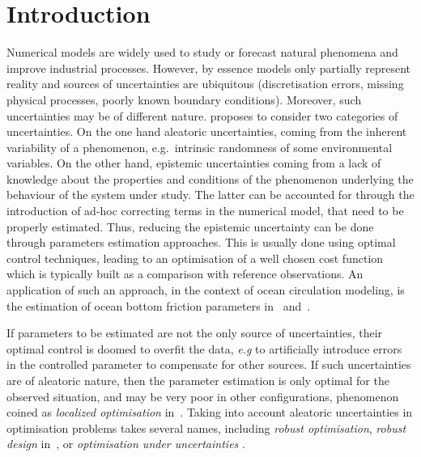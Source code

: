\documentclass[preprint, 1p]{elsarticle}
\newcommand{\arthur}[1]{{\itshape\color{cyan} ({#1})}}
\begin{document}

\section{Introduction}
\label{sec:intro}

Numerical models are widely used to study or forecast natural phenomena and improve industrial processes. However, by essence models only partially represent reality and sources of uncertainties are ubiquitous (discretisation errors, missing physical processes, poorly known boundary conditions).
%
Moreover, such uncertainties may be of different nature. 
\cite{walker_defining_2003} proposes to consider two categories of uncertainties. On the one hand aleatoric uncertainties,  coming from the inherent variability of a phenomenon, e.g.\ intrinsic randomness of some environmental variables. On the other hand, epistemic uncertainties coming from a lack of knowledge about the properties and conditions of the phenomenon underlying the behaviour of the system under study.
The latter can be accounted for through the introduction of ad-hoc correcting terms in the numerical model, that need to be properly estimated. Thus, reducing the epistemic uncertainty can be done through parameters estimation approaches. 
This is usually done using optimal control techniques, leading to an optimisation of a well chosen cost function which is typically built as a comparison with reference observations.
%
An application of such an approach, in the context of ocean circulation modeling, is the estimation of ocean bottom friction parameters in~\cite{das_estimation_1991} and~\cite{boutet_estimation_2015}. 


If parameters to be estimated are not the only source of uncertainties, their optimal control 
is doomed to overfit the data, \emph{e.g} to artificially introduce errors in the controlled parameter to compensate for other sources. If such uncertainties are of aleatoric nature, then the parameter estimation is only optimal for the observed situation, and may be very poor in other configurations, phenomenon coined as \textit{localized optimisation} in~\cite{huyse_free-form_2001}.
Taking into account aleatoric uncertainties in optimisation problems takes several names, including \textit{robust optimisation}, \textit{robust design} in~\cite{lelievre_consideration_2016}, or \textit{optimisation under uncertainties} \citep{petrone_robustness_2011, seshadri_density-matching_2014,cook_horsetail_2018}. 
\end{document}
